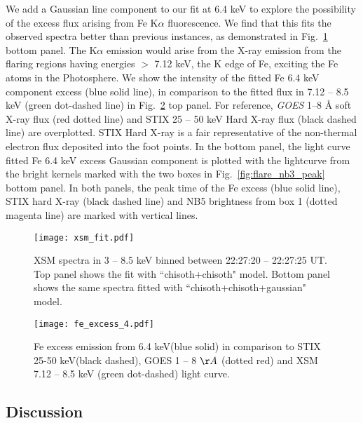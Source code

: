 We add a Gaussian line component to our fit at 6.4 keV to explore the possibility of the excess flux arising from Fe K$\alpha$ fluorescence. We find that this fits the observed spectra better than previous instances, as demonstrated in Fig.~\ref{fig:xsm_fit} bottom panel. The K$\alpha$ emission would arise from the X-ray emission from the flaring regions having energies $>$ 7.12 keV, the K edge of Fe, exciting the Fe atoms in the Photosphere. We show the intensity of the fitted Fe 6.4 keV component excess (blue solid line), in comparison to the fitted flux in 7.12 {--} 8.5 keV (green dot-dashed line) in Fig.~\ref{fig:fe_excess} top panel. For reference, {\it GOES} 1{--}8 {\AA} soft X-ray flux (red dotted line) and STIX 25 {--} 50 keV Hard X-ray flux (black dashed line) are overplotted. STIX Hard X-ray is a fair representative of the non-thermal electron flux deposited into the foot points. In the bottom panel, the light curve fitted Fe 6.4 keV excess Gaussian component is plotted with the lightcurve from the bright kernels marked with the two boxes in Fig.~\ref{fig:flare_nb3_peak} bottom panel. In both panels, the peak time of the Fe excess (blue solid line), STIX hard X-ray (black dashed line) and NB5 brightness from box 1 (dotted magenta line) are marked with vertical lines.

\begin{figure}[ht!]
    \centering
    \texttt{[image: xsm\_fit.pdf]}
    \caption{XSM spectra in 3 {--} 8.5 keV binned between 22:27:20 {--} 22:27:25 UT. Top panel shows the fit with ``chisoth+chisoth" model. Bottom panel shows the same spectra fitted with ``chisoth+chisoth+gaussian" model.}
    \label{fig:xsm_fit}
\end{figure}

\begin{figure}[ht!]
\centering
    \texttt{[image: fe\_excess\_4.pdf]}
    \caption{Fe excess emission from 6.4 keV(blue solid) in comparison to STIX 25-50 keV(black dashed), GOES 1 {--} 8 $\AA$ (dotted red) and XSM 7.12 {--} 8.5 keV (green dot-dashed) light curve.}
    \label{fig:fe_excess}
\end{figure}

\subsection{Discussion}\label{sec:dis1}

